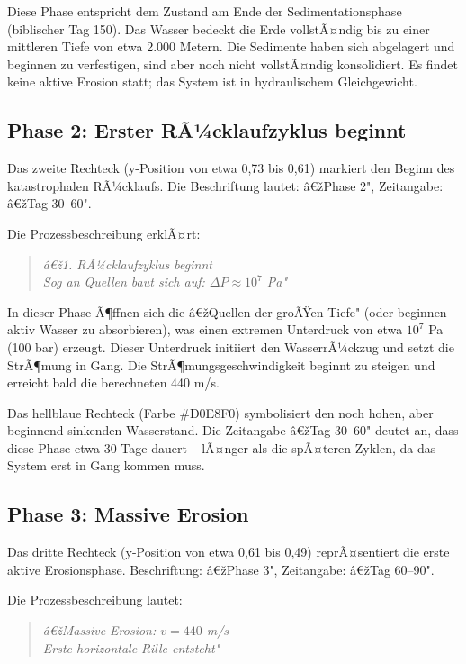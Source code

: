 ﻿\documentclass[12pt,a4paper]{report}
\begin{document}
Diese Phase entspricht dem Zustand am Ende der Sedimentationsphase (biblischer Tag 150). Das Wasser bedeckt die Erde vollstÃ¤ndig bis zu einer mittleren Tiefe von etwa 2.000 Metern. Die Sedimente haben sich abgelagert und beginnen zu verfestigen, sind aber noch nicht vollstÃ¤ndig konsolidiert. Es findet keine aktive Erosion statt; das System ist in hydraulischem Gleichgewicht.

\subsection{Phase 2: Erster RÃ¼cklaufzyklus beginnt}

Das zweite Rechteck (y-Position von etwa 0,73 bis 0,61) markiert den Beginn des katastrophalen RÃ¼cklaufs. Die Beschriftung lautet: â€žPhase 2", Zeitangabe: â€žTag 30--60".

Die Prozessbeschreibung erklÃ¤rt:
\begin{quote}
	\textit{â€ž1. RÃ¼cklaufzyklus beginnt\\
		Sog an Quellen baut sich auf: $\Delta P \approx 10^7$ Pa"}
\end{quote}

In dieser Phase Ã¶ffnen sich die â€žQuellen der groÃŸen Tiefe" (oder beginnen aktiv Wasser zu absorbieren), was einen extremen Unterdruck von etwa $10^7$ Pa (100 bar) erzeugt. Dieser Unterdruck initiiert den WasserrÃ¼ckzug und setzt die StrÃ¶mung in Gang. Die StrÃ¶mungsgeschwindigkeit beginnt zu steigen und erreicht bald die berechneten 440 m/s.

Das hellblaue Rechteck (Farbe \#D0E8F0) symbolisiert den noch hohen, aber beginnend sinkenden Wasserstand. Die Zeitangabe â€žTag 30--60" deutet an, dass diese Phase etwa 30 Tage dauert -- lÃ¤nger als die spÃ¤teren Zyklen, da das System erst in Gang kommen muss.

\subsection{Phase 3: Massive Erosion}

Das dritte Rechteck (y-Position von etwa 0,61 bis 0,49) reprÃ¤sentiert die erste aktive Erosionsphase. Beschriftung: â€žPhase 3", Zeitangabe: â€žTag 60--90".

Die Prozessbeschreibung lautet:
\begin{quote}
	\textit{â€žMassive Erosion: $v = 440$ m/s\\
		Erste horizontale Rille entsteht"}
\end{quote}
\end{document}
